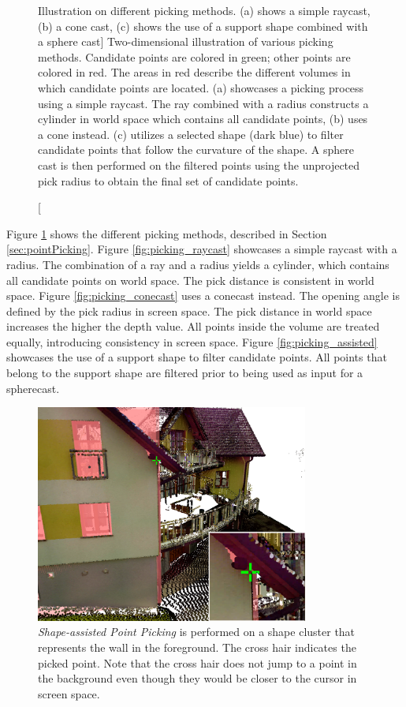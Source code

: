 \begin{figure}
{  }
\caption
[Illustration on different picking methods. (a) shows a simple raycast, (b) a cone cast, (c) shows the use of a support shape combined with a sphere cast]
{Two-dimensional illustration of various picking methods. Candidate points are colored in green; other points are colored in red. The areas in red describe the different volumes in which candidate points are located. (a) showcases a picking process using a simple raycast. The ray combined with a radius constructs a cylinder in world space which contains all candidate points, (b) uses a cone instead. (c) utilizes a selected shape (dark blue) to filter candidate points that follow the curvature of the shape. A sphere cast is then performed on the filtered points using the unprojected pick radius to obtain the final set of candidate points. }
\label{fig:picking_overview}
\end{figure}


Figure \ref{fig:picking_overview} shows the different picking methods, described in Section \ref{sec:pointPicking}. Figure \ref{fig:picking_raycast} showcases a simple raycast with a radius. The combination of a ray and a radius yields a cylinder, which contains all candidate points on world space. The pick distance is consistent in world space. Figure \ref{fig:picking_conecast} uses a conecast instead. The opening angle is defined by the pick radius in screen space. The pick distance in world space increases the higher the depth value. All points inside the volume are treated equally, introducing consistency in screen space. Figure \ref{fig:picking_assisted} showcases the use of a support shape to filter candidate points. All points that belong to the support shape are filtered prior to being used as input for a spherecast. 


\begin{figure}
    \centering
    \includegraphics[width=0.8\textwidth]{System_Design/picking_assisted_screenshot.png}%
    \caption[Screenshot of Shape-assisted Point Picking]
		{\textit{Shape-assisted Point Picking} is performed on a shape cluster that represents the wall in the foreground. The cross hair indicates the picked point. Note that the cross hair does not jump to a point in the background even though they would be closer to the cursor in screen space. }
    \label{fig:picking_assisted_screenshot}
\end{figure}


